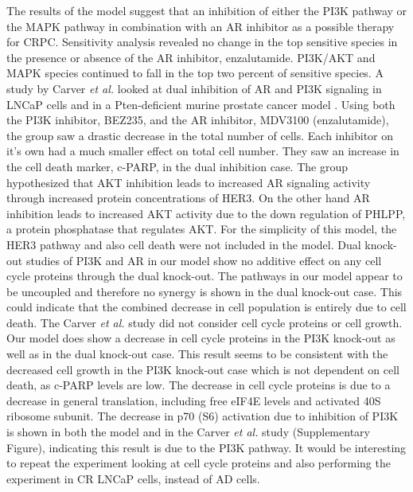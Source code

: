 \documentclass[12pt]{article}
\begin{document}
The results of the model suggest that an inhibition of either the PI3K pathway or the MAPK pathway in combination with an AR inhibitor as a possible therapy for CRPC. 
Sensitivity analysis revealed no change in the top sensitive species in the presence or absence of the AR inhibitor, enzalutamide. 
PI3K/AKT and MAPK species continued to fall in the top two percent of sensitive species. 
A study by Carver \textit{et al.} looked at dual inhibition of AR and PI3K signaling in LNCaP cells and in a Pten-deficient murine prostate cancer model \cite{Parker2013}. 
Using both the PI3K inhibitor, BEZ235, and the AR inhibitor, MDV3100 (enzalutamide), the group saw a drastic decrease in the total number of cells. 
Each inhibitor on it’s own had a much smaller effect on total cell number. They saw an increase in the cell death marker, c-PARP, in the dual inhibition case. 
The group hypothesized that AKT inhibition leads to increased AR signaling activity through increased protein concentrations of HER3. 
On the other hand AR inhibition leads to increased AKT activity due to the down regulation of PHLPP, a protein phosphatase that regulates AKT. 
For the simplicity of this model, the HER3 pathway and also cell death were not included in the model. 
Dual knock-out studies of PI3K and AR in our model show no additive effect on any cell cycle proteins through the dual knock-out. 
The pathways in our model appear to be uncoupled and therefore no synergy is shown in the dual knock-out case. 
This could indicate that the combined decrease in cell population is entirely due to cell death. 
The Carver \textit{et al.} study did not consider cell cycle proteins or cell growth. 
Our model does show a decrease in cell cycle proteins in the PI3K knock-out as well as in the dual knock-out case. 
This result seems to be consistent with the decreased cell growth in the PI3K knock-out case which is not dependent on cell death, as c-PARP levels are low. 
The decrease in cell cycle proteins is due to a decrease in general translation, including free eIF4E levels and activated 40S ribosome subunit. 
The decrease in p70 (S6) activation due to inhibition of PI3K is shown in both the model and in the Carver \textit{et al.} study (Supplementary Figure), indicating this result is due to the PI3K pathway. 
It would be interesting to repeat the experiment looking at cell cycle proteins and also performing the experiment in CR LNCaP cells, instead of AD cells.  

\end{document}
